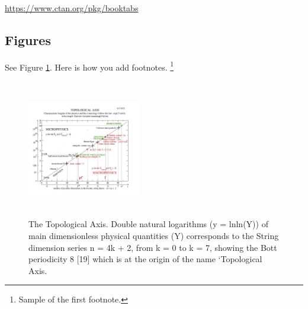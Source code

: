 \documentclass{article}
\begin{document}
\begin{center}
  \url{https://www.ctan.org/pkg/booktabs}
\end{center}


\subsection{Figures}
\lipsum[10] 
See Figure \ref{fig:fig1}. Here is how you add footnotes. \footnote{Sample of the first footnote.}
\lipsum[11] 

\begin{figure}
  \centering
  \includegraphics[width=5cm,height=6cm]{./figures/figure.png}
  \caption{The Topological Axis. Double natural logarithms (y = lnln(Y)) of main dimensionless physical quantities 
(Y) corresponds to the String dimension series n = 4k + 2, from k = 0 to k = 7, showing the Bott
periodicity 8 [19] which is at the origin of the name `Topological Axis.}
  \label{fig:fig1}
\end{figure}
\end{document}
